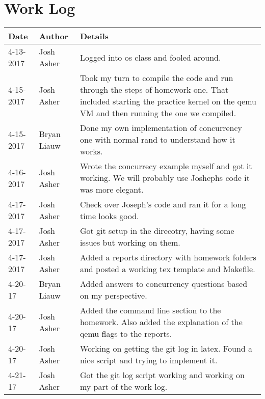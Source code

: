 \documentclass[10pt,draftclsnofoot,onecolumn, compsoc]{IEEEtran}
\begin{document}
\section{Work Log}
\begin{tabular}{| l | l | p{15cm} |}\textbf{Date} & \textbf{Author} & \textbf{Details}\\\hline
4-13-2017&Josh Asher&Logged into os class and fooled around.\\\hline
4-15-2017&Josh Asher&Took my turn to compile the code and run through the steps of homework one. That included starting the practice kernel on the qemu VM and then running the one we compiled.\\\hline
4-15-2017&Bryan Liauw&Done my own implementation of concurrency one with normal rand to understand how it works.\\\hline
4-16-2017&Josh Asher&Wrote the concurrecy example myself and got it working. We will probably use Joshephs code it was more elegant.\\\hline
4-17-2017&Josh Asher&Check over Joseph's code and ran it for a long time looks good.\\\hline
4-17-2017&Josh Asher&Got git setup in the direcotry, having some issues but working on them.\\\hline
4-17-2017&Josh Asher&Added a reports directory with homework folders and posted a working tex template and Makefile.\\\hline
4-20-17&Bryan Liauw&Added answers to concurrency questions based on my perspective.\\\hline
4-20-17&Josh Asher&Added the command line section to the homework. Also added the explanation of the qemu flags to the reports.\\\hline
4-20-17&Josh Asher&Working on getting the git log in latex. Found a nice script and trying to implement it.\\\hline
4-21-17&Josh Asher&Got the git log script working and working on my part of the work log.\\\hline
\end{tabular}
\end{document}
